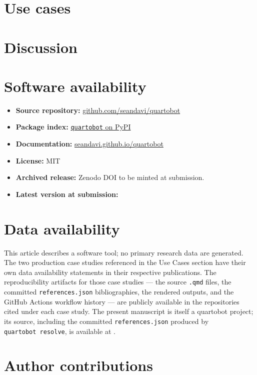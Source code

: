 \documentclass[
  letterpaper,
  DIV=11,
  numbers=noendperiod]{scrartcl}
\providecommand{\tightlist}{%
  \setlength{\itemsep}{0pt}\setlength{\parskip}{0pt}}
\begin{document}
\section{Use cases}\label{use-cases}

\section{Discussion}\label{discussion}

\section{Software availability}\label{software-availability}

\begin{itemize}
\tightlist
\item
  \textbf{Source repository:}
  \href{https://github.com/seandavi/quartobot}{github.com/seandavi/quartobot}
\item
  \textbf{Package index:}
  \href{https://pypi.org/project/quartobot/}{\texttt{quartobot} on PyPI}
\item
  \textbf{Documentation:}
  \href{https://seandavi.github.io/quartobot/}{seandavi.github.io/quartobot}
\item
  \textbf{License:} MIT
\item
  \textbf{Archived release:} Zenodo DOI to be minted at submission.
\item
  \textbf{Latest version at submission:}
\end{itemize}

\section{Data availability}\label{data-availability}

This article describes a software tool; no primary research data are
generated. The two production case studies referenced in the Use Cases
section have their own data availability statements in their respective
publications. The reproducibility artifacts for those case studies ---
the source \texttt{.qmd} files, the committed \texttt{references.json}
bibliographies, the rendered outputs, and the GitHub Actions workflow
history --- are publicly available in the repositories cited under each
case study. The present manuscript is itself a quartobot project; its
source, including the committed \texttt{references.json} produced by
\texttt{quartobot\ resolve}, is available at .

\section{Author contributions}\label{author-contributions}
\end{document}
